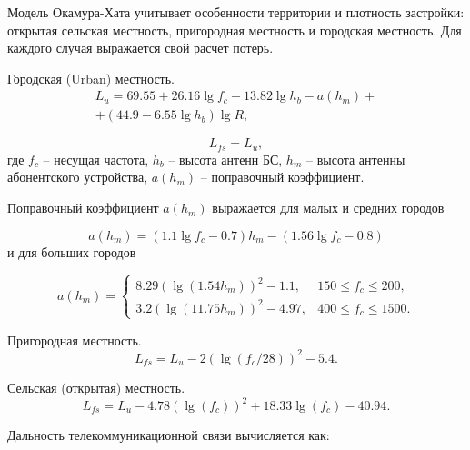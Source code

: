 Модель Окамура-Хата учитывает особенности территории и плотность застройки: открытая сельская местность, пригородная местность и городская местность. Для каждого случая выражается свой расчет потерь.

Городская  (Urban) местность.
\begin{equation}
  \label{eq:part1_okam_hata_model_l_u}
  \begin{gathered}
  L_u = 69.55 + 26.16\lg{f_c} - 13.82\lg{h_b} - a(h_m) + \\ + (44.9 - 6.55 \lg{h_b}) \lg{R},
  \end{gathered}
\end{equation}

\begin{equation}
  \label{eq:part1_okam_hata_model_l_ufs}
  L_{fs} = L_u,
\end{equation}
где $f_c$ -- несущая частота, $h_b$ --  высота антенн БС, $h_m$ -- высота антенны абонентского устройства, $a(h_m)$ -- поправочный коэффициент. 

Поправочный коэффициент $a(h_m)$ выражается для малых и средних городов

\begin{equation}
  \label{eq:part1_okam_hata_model_a(h_m)_1}
  a(h_m) = (1.1 \lg{f_c} - 0.7) h_m - (1.56 \lg{f_c} - 0.8)
\end{equation}
и для больших городов

\begin{equation}
  \label{eq:part1_okam_hata_model_a(h_m)_2}
  a(h_m) = 
  \begin{cases}
    8.29(\lg{(1.54h_m)})^2 - 1.1, & 150 \leq f_c \leq 200,\\
    3.2(\lg{(11.75h_m)})^2 - 4.97,  & 400 \leq f_c \leq 1500.
  \end{cases}
\end{equation}

Пригородная местность.
\begin{equation}
  \label{eq:part1_okam_hata_model_l_sfs}
  L_{fs} = L_u - 2(\lg(f_c/28))^2 -5.4.
\end{equation}

Сельская (открытая) местность.
\begin{equation}
  \label{eq:part1_okam_hata_model_l_ofs}
  L_{fs} = L_u - 4.78(\lg(f_c))^2 + 18.33\lg(f_c) - 40.94.
\end{equation}


Дальность телекоммуникационной связи вычисляется как:


